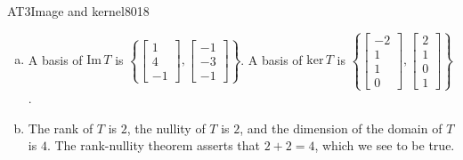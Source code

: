 \begin{exercise}{AT3}{Image and kernel}{8018}
\begin{exerciseAnswer}
\begin{enumerate}[(a)]
 
\item  

 A basis of \(\mathrm{Im}\,T\) is \(\left\{ \left[\begin{array}{c}
1 \\
4 \\
-1
\end{array}\right] , \left[\begin{array}{c}
-1 \\
-3 \\
-1
\end{array}\right] \right\}\). A basis of \(\mathrm{ker}\,T\) is \(\left\{ \left[\begin{array}{c}
-2 \\
1 \\
1 \\
0
\end{array}\right] , \left[\begin{array}{c}
2 \\
1 \\
0 \\
1
\end{array}\right] \right\}\). 

 
\item  

 The rank of \(T\) is \(2\), the nullity of \(T\) is \(2\), and the dimension of the domain of \(T\) is \(4\). The rank-nullity theorem asserts that \(2+2=4\), which we see to be true. 

 
\end{enumerate}

     \end{exerciseAnswer}
 \end{exercise}


